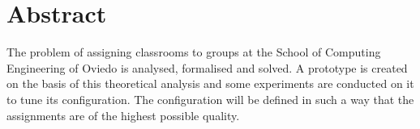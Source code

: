 
\chapter*{Abstract}

The problem of assigning classrooms to groups at the School of Computing Engineering of Oviedo is analysed, formalised and solved. A prototype is created on the basis of this theoretical analysis and some experiments are conducted on it to tune its configuration. The configuration will be defined in such a way that the assignments are of the highest possible quality.

